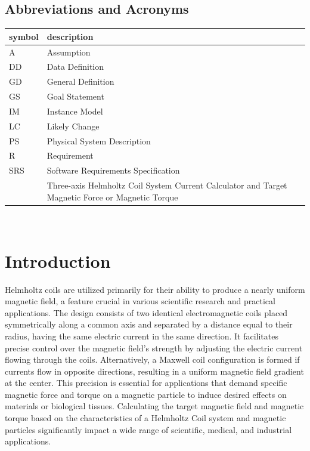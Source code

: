 \documentclass[12pt]{article}
\begin{document}
\subsection{Abbreviations and Acronyms}

\renewcommand{\arraystretch}{1.2}
\begin{tabular}{lp{15cm}} 
  \toprule		
  \textbf{symbol} & \textbf{description}\\
  \midrule 
  A & Assumption\\
  DD & Data Definition\\
  GD & General Definition\\
  GS & Goal Statement\\
  IM & Instance Model\\
  LC & Likely Change\\
  PS & Physical System Description\\
  R & Requirement\\
  SRS & Software Requirements Specification\\
  \progname{} & Three-axis Helmholtz Coil System Current Calculator and Target Magnetic Force or Magnetic Torque\\
  \bottomrule
\end{tabular}\\

\newpage


\section{Introduction}
{
Helmholtz coils are utilized primarily for their ability to produce a nearly uniform magnetic field, a feature crucial in various scientific research and practical applications. The design consists of two identical electromagnetic coils placed symmetrically along a common axis and separated by a distance equal to their radius, having the same electric current in the same direction. It facilitates precise control over the magnetic field's strength by adjusting the electric current flowing through the coils. Alternatively, a Maxwell coil configuration is formed if currents flow in opposite directions, resulting in a uniform magnetic field gradient at the center. This precision is essential for applications that demand specific magnetic force and torque on a magnetic particle to induce desired effects on materials or biological tissues. Calculating the target magnetic field and magnetic torque based on the characteristics of a Helmholtz Coil system and magnetic particles significantly impact a wide range of scientific, medical, and industrial applications.
}
\end{document}
